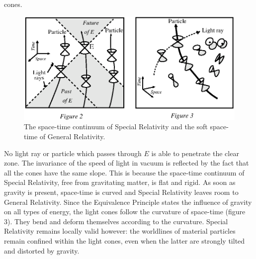 \documentclass{lamuphys}
\begin{document}
cones.
\begin{figure}[htb]
\renewcommand \thefigure {2\&3}
  \begin{center}
    \leavevmode
    \includegraphics{spacetime.ps} 
    \caption{The space-time continuum of Special Relativity and
             the soft space-time of General Relativity.}
\end{center}
\end{figure}
\setcounter{figure}{3}
No light ray or particle which passes through $E$ is able to penetrate the
clear zone. The invariance of the speed of light in vacuum is
reflected by the fact that all the  cones have the same slope. This is because
the space-time continuum of Special Relativity, free from gravitating matter,
is flat and rigid. As soon as gravity is present,
space-time is curved and Special Relativity leaves room to General Relativity.
Since the 
Equivalence Principle
states the influence of gravity on all types of energy,
the light cones follow the curvature of space-time (figure 3). They bend
and deform themselves according to the curvature. Special Relativity
remains locally valid however: the worldlines of material
particles remain confined within the light cones, even when the latter are
strongly tilted and distorted by gravity. 
\end{document}
